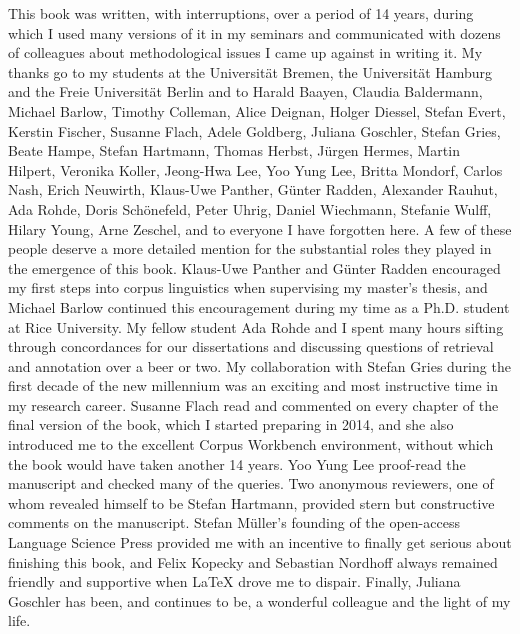 \addchap{\lsAcknowledgementTitle} 

\addchap{\lsAcknowledgementTitle} 

This book was written, with interruptions, over a period of 14 years, during which I used many versions of it in my seminars and communicated with dozens of colleagues about methodological issues I came up against in writing it. My thanks go to my students at the
Universität Bremen, the Universität Hamburg and the Freie Universität Berlin and to Harald Baayen, Claudia Baldermann, Michael Barlow, Timothy Colleman, Alice Deignan, Holger Diessel, Stefan Evert, Kerstin Fischer, Susanne Flach, Adele Goldberg, Juliana Goschler, Stefan Gries, Beate Hampe, Stefan Hartmann, Thomas Herbst, Jürgen Hermes, Martin Hilpert, Veronika Koller, Jeong-Hwa Lee, Yoo Yung Lee, Britta Mondorf, Carlos Nash, Erich Neuwirth, Klaus-Uwe Panther, Günter Radden, Alexander Rauhut, Ada Rohde, Doris Schönefeld, Peter Uhrig, Daniel Wiechmann, Stefanie Wulff, Hilary Young, Arne Zeschel, and to everyone I have forgotten here. A few of these people deserve a more detailed mention for the substantial roles they played in the emergence of this book. Klaus-Uwe Panther and Günter Radden encouraged my first steps into corpus linguistics when supervising my master's thesis, and Michael Barlow continued this encouragement during my time as a Ph.D. student at Rice University. My fellow student Ada Rohde and I spent many hours sifting through concordances for our dissertations and discussing questions of retrieval and annotation over a beer or two. My collaboration with Stefan Gries during the first decade of the new millennium was an exciting and most instructive time in my research career. Susanne Flach read and commented on every chapter of the final version of the book, which I started preparing in 2014, and she also introduced me to the excellent Corpus Workbench environment, without which the book would have taken another 14 years. Yoo Yung Lee proof-read the manuscript and checked many of the queries. Two anonymous reviewers, one of whom revealed himself to be Stefan Hartmann, provided stern but constructive comments on the manuscript. Stefan Müller's founding of the open-access Language Science Press provided me with an incentive to finally get serious about finishing this book, and Felix Kopecky and Sebastian Nordhoff always remained friendly and supportive when {\LaTeX} drove me to dispair. Finally, Juliana Goschler has been, and continues to be, a wonderful colleague and the light of my life.

